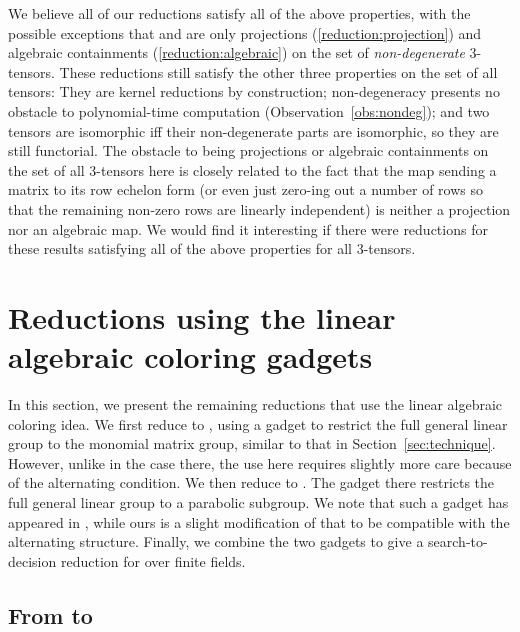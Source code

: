 \documentclass[11pt]{article}
\begin{document}
\begin{remark} \label{rmk:reductions}
We believe all of our reductions satisfy all of the above properties, with the 
possible exceptions that  and 
 are only projections (\ref{reduction:projection}) 
and algebraic containments (\ref{reduction:algebraic}) on the set of 
\emph{non-degenerate} 3-tensors. These reductions still satisfy the other three 
properties on the set of all tensors: They are kernel reductions by construction; 
non-degeneracy presents no obstacle to polynomial-time computation 
(Observation~\ref{obs:nondeg}); and two tensors are isomorphic iff their 
non-degenerate parts are isomorphic, so they are still functorial. The obstacle to 
being projections or algebraic containments on the set of all 3-tensors here is 
closely related to the fact that the map sending a matrix to its row echelon form 
(or even just zero-ing out a number of rows so that the remaining non-zero rows 
are linearly independent) is neither a projection nor an algebraic map. We would 
find it interesting if there were reductions for these results satisfying all of 
the above properties for all 3-tensors.
\end{remark}

\section{Reductions using the linear algebraic coloring 
gadgets}\label{sec:reduction_gadget}

In this section, we present the remaining reductions that use the linear algebraic 
coloring idea. We first reduce \GIlong to \AltMatSpIsomlong, using a gadget to restrict the full 
general linear group to the monomial matrix 
group, 
similar to that in Section~\ref{sec:technique}. However, unlike in the 
case there, the use here requires slightly more care because of the 
alternating condition. 
We then 
reduce \ThreeTIlong to \AltMatSpIsomlong. 
The gadget there restricts the full general linear group to a 
parabolic subgroup. We note that such a gadget has appeared in \cite{FGS19}, while 
ours is a slight modification of that to be compatible with the alternating 
structure. Finally, we combine the two gadgets to give a search-to-decision 
reduction for \AltMatSpIsomlong over finite fields. 

\subsection{From \GIlong to \AltMatSpIsomlong}\label{sec:graphiso_alternating}
\end{document}
